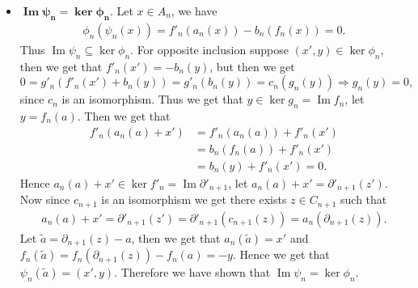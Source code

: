 \documentclass[11pt]{article}
\newcommand{\p}{\partial}
\begin{document}
 \begin{itemize}
     \item $\mathbf{\operatorname{Im}\psi_n = \ker\phi_n}$. Let $x \in A_n$, we have
     \begin{align*}
         \phi_n(\psi_n(x)) = f'_n(a_n(x)) - b_n(f_n(x)) = 0.
     \end{align*}
     Thus $\operatorname{Im}\psi_n \subseteq \ker\phi_n$. For opposite inclusion suppose $(x',y) \in \ker\phi_n$, then we get that $f'_n(x') = -b_n(y)$, but then we get 
     \[
         0 = g'_n(f'_n(x') + b_n(y)) = g'_n(b_n(y)) = c_n(g_n(y)) \Rightarrow g_n(y) = 0,    
     \]
     since $c_n$ is an isomorphism. Thus we get that $y \in \ker g_n = \operatorname{Im} f_n$, let $y = f_n(a)$. Then we get that 
     \begin{align*}
         f'_n(a_n(a)+x') &= f'_n(a_n(a)) + f'_n(x') \\ &= b_n(f_n(a)) + f'_n(x') \\ &= b_n(y)+f'_n(x') = 0.
     \end{align*}
     Hence $a_n(a) + x' \in \ker f'_n = \operatorname{Im} \p'_{n+1}$, let $a_n(a)+x' = \p'_{n+1}(z')$. Now since $c_{n+1}$ is an isomorphism we get there exists $z \in C_{n+1}$ such that 
     \begin{align*}
         a_n(a) + x' = \p'_{n+1}(z') = \p'_{n+1}(c_{n+1}(z)) = a_n(\p_{n+1}(z)).
     \end{align*}
     Let $\widetilde{a} = \p_{n+1}(z) - a$, then we get that $a_n(\widetilde{a}) = x'$ and $f_n(\widetilde{a}) = f_n(\p_{n+1}(z)) - f_n(a) = -y$. Hence we get that $\psi_n(\widetilde{a}) = (x',y)$. Therefore we have shown that $\operatorname{Im} \psi_n = \ker \phi_n$.
 

\end{itemize}
\end{document}
